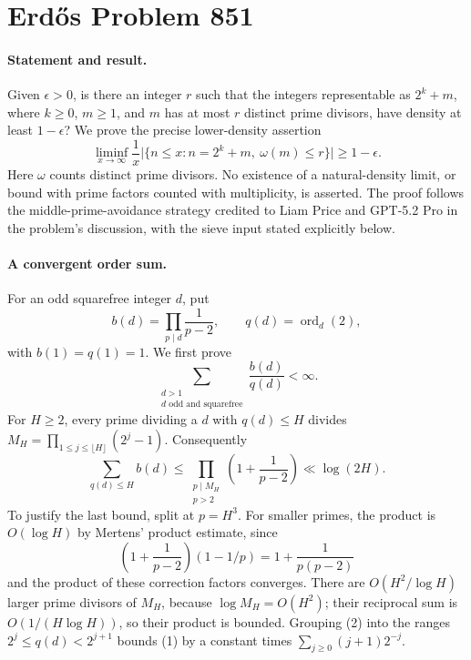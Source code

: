 \section*{Erd\H{o}s Problem 851}

\paragraph{Statement and result.}
Given \(\epsilon>0\), is there an integer \(r\) such that the integers representable as \(2^k+m\), where \(k\geq0\), \(m\geq1\), and \(m\) has at most \(r\) distinct prime divisors, have density at least \(1-\epsilon\)? We prove the precise lower-density assertion
\[
 \liminf_{x\to\infty}\frac1x
 \bigl|\{n\leq x:n=2^k+m,\ \omega(m)\leq r\}\bigr|
 \geq1-\epsilon.
\]
Here \(\omega\) counts distinct prime divisors. No existence of a natural-density limit, or bound with prime factors counted with multiplicity, is asserted. The proof follows the middle-prime-avoidance strategy credited to Liam Price and GPT-5.2 Pro in the problem's discussion, with the sieve input stated explicitly below.

\paragraph{A convergent order sum.}
For an odd squarefree integer \(d\), put
\[
 b(d)=\prod_{p\mid d}\frac1{p-2},\qquad
 q(d)=\operatorname{ord}_d(2),
\]
with \(b(1)=q(1)=1\). We first prove
\[
 \sum_{\substack{d>1\\d\text{ odd and squarefree}}}
 \frac{b(d)}{q(d)}<\infty. \tag{1}
\]
For \(H\geq2\), every prime dividing a \(d\) with \(q(d)\leq H\) divides
\(M_H=\prod_{1\leq j\leq\lfloor H\rfloor}(2^j-1)\). Consequently
\[
 \sum_{q(d)\leq H}b(d)
 \leq\prod_{\substack{p\mid M_H\\p>2}}
 \left(1+\frac1{p-2}\right)\ll\log(2H). \tag{2}
\]
To justify the last bound, split at \(p=H^3\). For smaller primes, the product is \(O(\log H)\) by Mertens' product estimate, since
\[
 \left(1+\frac1{p-2}\right)(1-1/p)
 =1+\frac1{p(p-2)}
\]
and the product of these correction factors converges. There are \(O(H^2/\log H)\) larger prime divisors of \(M_H\), because \(\log M_H=O(H^2)\); their reciprocal sum is \(O(1/(H\log H))\), so their product is bounded. Grouping (2) into the ranges \(2^j\leq q(d)<2^{j+1}\) bounds (1) by a constant times \(\sum_{j\geq0}(j+1)2^{-j}\).

